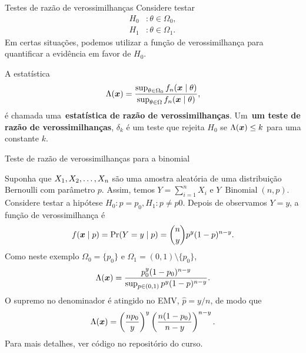 \begin{frame}{Testes de razão de verossimilhanças}
 Considere testar 
  \begin{align*}
   H_0 &:  \theta \in \Omega_0, \\
   H_1&:  \theta \in \Omega_1. 
  \end{align*}
Em certas situações, podemos utilizar a função de verossimilhança para quantificar a evidência em favor de $H_0$.
\begin{defn}
 \label{def:LRT}
 A estatística
 \[ \Lambda(\boldsymbol{x}) = \frac{\sup_{\theta \in \Omega_0} f_n(\boldsymbol{x} \mid \theta) }{\sup_{\theta \in \Omega} f_n(\boldsymbol{x} \mid \theta)}, \]
 é chamada uma~\textbf{estatística de razão de verossimilhanças}.
 Um~\textbf{um teste de razão de verossimilhanças}, $\delta_k$ é um teste que rejeita $H_0$ se $\Lambda(\boldsymbol{x}) \leq k$ para uma constante $k$.
\end{defn}
\end{frame}

\begin{frame}{Teste de razão de verossimilhanças para a binomial}
\begin{exemplo}
\label{ex:LRT_simple_hypothesis}
 Suponha que $X_1, X_2, \ldots, X_n$ são uma amostra aleatória de uma distribuição Bernoulli com parâmetro $p$.
 Assim, temos $Y = \sum_{i=1}^n X_i$ e $Y~\operatorname{Binomial}(n, p)$.
 Considere testar a hipótese $H_0 :  p  = p_0, H_1:  p  \neq p0$.  
 Depois de observamos $Y = y$, a função de verossimilhança é
 \[ f(\boldsymbol{x} \mid p) = \operatorname{Pr}(Y = y\mid p) = \binom{n}{y} p^y (1-p)^{n-y}. \]
 Como neste exemplo $\Omega_0 = \{p_0\}$ e $\Omega_1 = (0, 1)\setminus\{p_0\}$,
 \begin{equation*}
  \Lambda(\boldsymbol{x}) = \frac{p_0^y (1-p_0)^{n-y}}{\sup_{p \in (0,1)}  p^y (1-p)^{n-y}}.
 \end{equation*}
O supremo no denominador é atingido no EMV, $\hat{p} = y/n$, de modo que
 \begin{equation*}
  \Lambda(\boldsymbol{x}) = \left(\frac{np_0}{y}\right)^{y} \left(\frac{n(1-p_0)}{n-y}\right)^{n-y}.
 \end{equation*}
 Para mais detalhes, ver código no repositório do curso.
\end{exemplo} 
\end{frame}

